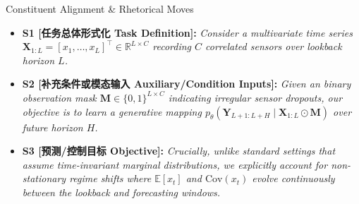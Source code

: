 \begin{TipBox}{Constituent Alignment \& Rhetorical Moves}
\begin{itemize}[leftmargin=1.5em]
  \item \textbf{S1 [任务总体形式化 Task Definition]:} \textit{Consider a multivariate time series $\mathbf{X}_{1:L} = [x_1, \dots, x_L]^\top \in \mathbb{R}^{L \times C}$ recording $C$ correlated sensors over lookback horizon $L$.}\par{}
  \item \textbf{S2 [补充条件或模态输入 Auxiliary/Condition Inputs]:} \textit{Given an binary observation mask $\mathbf{M} \in \{0, 1\}^{L \times C}$ indicating irregular sensor dropouts, our objective is to learn a generative mapping $p_\theta(\mathbf{Y}_{L+1:L+H} \mid \mathbf{X}_{1:L} \odot \mathbf{M})$ over future horizon $H$.}\par{}
  \item \textbf{S3 [预测/控制目标 Objective]:} \textit{Crucially, unlike standard settings that assume time-invariant marginal distributions, we explicitly account for non-stationary regime shifts where $\mathbb{E}[x_t]$ and $\text{Cov}(x_t)$ evolve continuously between the lookback and forecasting windows.}\par{}
\end{itemize}
\end{TipBox}
\bigskip
